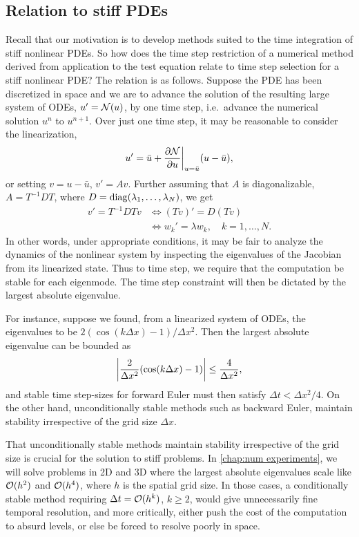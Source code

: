 \subsection{Relation to stiff PDEs}
Recall that our motivation is to develop methods suited to the time integration of stiff nonlinear PDEs. So how does the time step restriction of a numerical method derived from application to the test equation relate to time step selection for a stiff nonlinear PDE? The relation is as follows. Suppose the PDE has been discretized in space and we are to advance the solution of the resulting large system of ODEs, $u' = \mathcal{N}(u)$, by one time step, i.e.\ advance the numerical solution $u^n$ to $u^{n+1}$. Over just one time step, it may be reasonable to consider the linearization, 
\begin{align*}
        u' = \bar u + \frac{\partial\mathcal{N}}{\partial u} \bigg|_{u=\bar u} (u-\bar u), 
\end{align*}
or setting $v=u-\bar u$, $v' = Av$. Further assuming that $A$ is diagonalizable, $A=T^{-1}DT$, where $D=\operatorname{diag}(\lambda_1,\dots,\lambda_N)$, we get 
\begin{align}
        v' = T^{-1}DTv 
&\iff (Tv)' = D(Tv)
\\&\iff w_k' = \lambda w_k, \quad k=1,\dots, N.
\end{align}
In other words, under appropriate conditions, it may be fair to analyze the dynamics of the nonlinear system by inspecting the eigenvalues of the Jacobian from its linearized state. Thus to time step, we require that the computation be stable for each eigenmode. The time step constraint will then be dictated by the largest absolute eigenvalue.

For instance, suppose we found, from a linearized system of ODEs, the eigenvalues to be $2(\cos(k\Delta x) -1)/\Delta x^2$. Then the largest absolute eigenvalue can be bounded as 
\begin{align}
    \left|\frac{2}{\Delta x^2}(\cos(k\Delta x) -1)\right| \leq \frac{4}{\Delta x^2},
\end{align}
and stable time step-sizes for forward Euler must then satisfy $\Delta t < \Delta x^2/4$. On the other hand, unconditionally stable methods such as backward Euler, maintain stability irrespective of the grid size $\Delta x$.

That unconditionally stable methods maintain stability irrespective of the grid size is crucial for the solution to stiff problems. In \cref{chap:num experiments}, we will solve problems in 2D and 3D where the largest absolute eigenvalues scale like $\mathcal{O}(h^2)$ and $\mathcal{O}(h^4)$, where $h$ is the spatial grid size. In those cases, a conditionally stable method requiring $\Delta t = \mathcal{O}(h^k)$, $k\geq 2$, would give unnecessarily fine temporal resolution, and more critically, either push the cost of the computation to absurd levels, or else be forced to resolve poorly in space.


